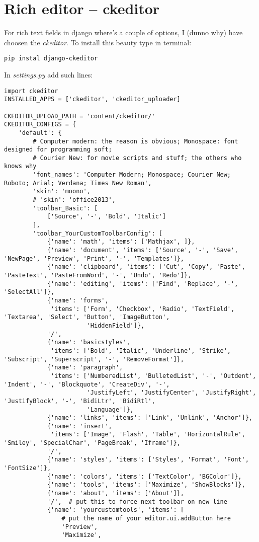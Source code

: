 \documentclass[12pt,a4paper]{article}
\begin{document}
\section{Rich editor -- ckeditor}
For rich text fields in django where's a couple of options, I (dunno why) have choosen the \textit{ckeditor}. To install this beauty type in terminal: \begin{verbatim}pip instal django-ckeditor\end{verbatim}
In \textit{settings.py} add such lines:
{\tiny \begin{verbatim}import ckeditor
INSTALLED_APPS = ['ckeditor', 'ckeditor_uploader]

CKEDITOR_UPLOAD_PATH = 'content/ckeditor/'
CKEDITOR_CONFIGS = {
    'default': {
        # Computer modern: the reason is obvious; Monospace: font designed for programming soft;
        # Courier New: for movie scripts and stuff; the others who knows why
        'font_names': 'Computer Modern; Monospace; Courier New; Roboto; Arial; Verdana; Times New Roman',
        'skin': 'moono',
        # 'skin': 'office2013',
        'toolbar_Basic': [
            ['Source', '-', 'Bold', 'Italic']
        ],
        'toolbar_YourCustomToolbarConfig': [
            {'name': 'math', 'items': ['Mathjax', ]},
            {'name': 'document', 'items': ['Source', '-', 'Save', 'NewPage', 'Preview', 'Print', '-', 'Templates']},
            {'name': 'clipboard', 'items': ['Cut', 'Copy', 'Paste', 'PasteText', 'PasteFromWord', '-', 'Undo', 'Redo']},
            {'name': 'editing', 'items': ['Find', 'Replace', '-', 'SelectAll']},
            {'name': 'forms',
             'items': ['Form', 'Checkbox', 'Radio', 'TextField', 'Textarea', 'Select', 'Button', 'ImageButton',
                       'HiddenField']},
            '/',
            {'name': 'basicstyles',
             'items': ['Bold', 'Italic', 'Underline', 'Strike', 'Subscript', 'Superscript', '-', 'RemoveFormat']},
            {'name': 'paragraph',
             'items': ['NumberedList', 'BulletedList', '-', 'Outdent', 'Indent', '-', 'Blockquote', 'CreateDiv', '-',
                       'JustifyLeft', 'JustifyCenter', 'JustifyRight', 'JustifyBlock', '-', 'BidiLtr', 'BidiRtl',
                       'Language']},
            {'name': 'links', 'items': ['Link', 'Unlink', 'Anchor']},
            {'name': 'insert',
             'items': ['Image', 'Flash', 'Table', 'HorizontalRule', 'Smiley', 'SpecialChar', 'PageBreak', 'Iframe']},
            '/',
            {'name': 'styles', 'items': ['Styles', 'Format', 'Font', 'FontSize']},
            {'name': 'colors', 'items': ['TextColor', 'BGColor']},
            {'name': 'tools', 'items': ['Maximize', 'ShowBlocks']},
            {'name': 'about', 'items': ['About']},
            '/',  # put this to force next toolbar on new line
            {'name': 'yourcustomtools', 'items': [
                # put the name of your editor.ui.addButton here
                'Preview',
                'Maximize',


\end{verbatim}}
\end{document}
